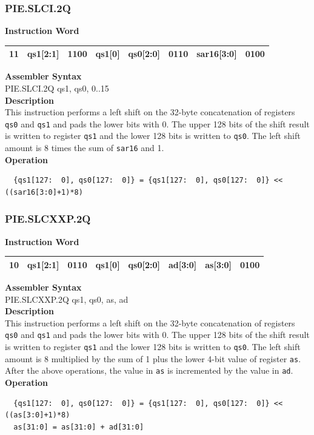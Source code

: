 \newpage
\subsubsection{PIE.SLCI.2Q}\label{instruction:PIESLCI2Q}
\setlength\tabcolsep{6pt}
\textbf{Instruction Word} \\
\begin{tabular}{|c|c|c|c|c|c|c|c|}
	\hline
	11 & qs1[2:1] & 1100 & qs1[0] & qs0[2:0] & 0110 & sar16[3:0] & 0100 \\
	\hline
\end{tabular}

\textbf{Assembler Syntax} \\
PIE.SLCI.2Q qs1, qs0, 0..15 \\
\textbf{Description} \\
This instruction performs a left shift on the 32-byte concatenation of registers \lstinline{qs0} and \lstinline{qs1} and pads the lower bits with 0. The upper 128 bits of the shift result is written to register \lstinline{qs1} and the lower 128 bits is written to \lstinline{qs0}. The left shift amount is 8 times the sum of \lstinline{sar16} and 1.\\
\textbf{Operation}
\begin{lstlisting}
  {qs1[127:  0], qs0[127:  0]} = {qs1[127:  0], qs0[127:  0]} << ((sar16[3:0]+1)*8)
\end{lstlisting}

\newpage
\subsubsection{PIE.SLCXXP.2Q}\label{instruction:PIESLCXXP2Q}
\setlength\tabcolsep{6pt}
\textbf{Instruction Word} \\
\begin{tabular}{|c|c|c|c|c|c|c|c|}
	\hline
	10 & qs1[2:1] & 0110 & qs1[0] & qs0[2:0] & ad[3:0] & as[3:0] & 0100 \\
	\hline
\end{tabular}

\textbf{Assembler Syntax} \\
PIE.SLCXXP.2Q qs1, qs0, as, ad \\
\textbf{Description} \\
This instruction performs a left shift on the 32-byte concatenation of registers \lstinline{qs0} and \lstinline{qs1} and pads the lower bits with 0. The upper 128 bits of the shift result is written to register \lstinline{qs1} and the lower 128 bits is written to \lstinline{qs0}. The left shift amount is 8 multiplied by the sum of 1 plus the lower 4-bit value of register \lstinline{as}. After the above operations, the value in \lstinline{as} is incremented by the value in \lstinline{ad}.\\
\textbf{Operation}
\begin{lstlisting}
  {qs1[127:  0], qs0[127:  0]} = {qs1[127:  0], qs0[127:  0]} << ((as[3:0]+1)*8)
  as[31:0] = as[31:0] + ad[31:0]
\end{lstlisting}

